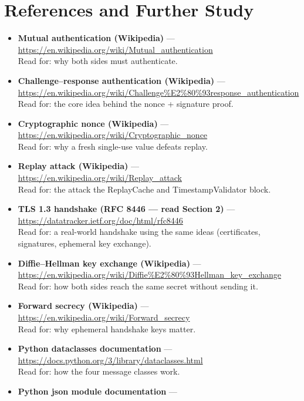 \documentclass[11pt,a4paper]{report}
\begin{document}
\section{References and Further Study}
\begin{itemize}
  \item \textbf{Mutual authentication (Wikipedia)} ---
        \url{https://en.wikipedia.org/wiki/Mutual_authentication}\\
        Read for: why both sides must authenticate.
  \item \textbf{Challenge--response authentication (Wikipedia)} ---
        \url{https://en.wikipedia.org/wiki/Challenge%E2%80%93response_authentication}\\
        Read for: the core idea behind the nonce + signature proof.
  \item \textbf{Cryptographic nonce (Wikipedia)} ---
        \url{https://en.wikipedia.org/wiki/Cryptographic_nonce}\\
        Read for: why a fresh single-use value defeats replay.
  \item \textbf{Replay attack (Wikipedia)} ---
        \url{https://en.wikipedia.org/wiki/Replay_attack}\\
        Read for: the attack the ReplayCache and TimestampValidator block.
  \item \textbf{TLS 1.3 handshake (RFC 8446 --- read Section 2)} ---
        \url{https://datatracker.ietf.org/doc/html/rfc8446}\\
        Read for: a real-world handshake using the same ideas (certificates,
        signatures, ephemeral key exchange).
  \item \textbf{Diffie--Hellman key exchange (Wikipedia)} ---
        \url{https://en.wikipedia.org/wiki/Diffie%E2%80%93Hellman_key_exchange}\\
        Read for: how both sides reach the same secret without sending it.
  \item \textbf{Forward secrecy (Wikipedia)} ---
        \url{https://en.wikipedia.org/wiki/Forward_secrecy}\\
        Read for: why ephemeral handshake keys matter.
  \item \textbf{Python dataclasses documentation} ---
        \url{https://docs.python.org/3/library/dataclasses.html}\\
        Read for: how the four message classes work.
  \item \textbf{Python json module documentation} ---

\end{itemize}
\end{document}
